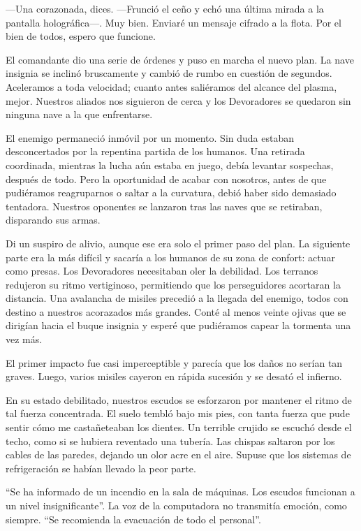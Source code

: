 —Una corazonada, dices. —Frunció el ceño y echó una última mirada a la pantalla holográfica—. Muy bien. Enviaré un mensaje cifrado a la flota. Por el bien de todos, espero que funcione.

El comandante dio una serie de órdenes y puso en marcha el nuevo plan. La nave insignia se inclinó bruscamente y cambió de rumbo en cuestión de segundos. Aceleramos a toda velocidad; cuanto antes saliéramos del alcance del plasma, mejor. Nuestros aliados nos siguieron de cerca y los Devoradores se quedaron sin ninguna nave a la que enfrentarse.

El enemigo permaneció inmóvil por un momento. Sin duda estaban desconcertados por la repentina partida de los humanos. Una retirada coordinada, mientras la lucha aún estaba en juego, debía levantar sospechas, después de todo. Pero la oportunidad de acabar con nosotros, antes de que pudiéramos reagruparnos o saltar a la curvatura, debió haber sido demasiado tentadora. Nuestros oponentes se lanzaron tras las naves que se retiraban, disparando sus armas.

Di un suspiro de alivio, aunque ese era solo el primer paso del plan. La siguiente parte era la más difícil y sacaría a los humanos de su zona de confort: actuar como presas. Los Devoradores necesitaban oler la debilidad. Los terranos redujeron su ritmo vertiginoso, permitiendo que los perseguidores acortaran la distancia. Una avalancha de misiles precedió a la llegada del enemigo, todos con destino a nuestros acorazados más grandes. Conté al menos veinte ojivas que se dirigían hacia el buque insignia y esperé que pudiéramos capear la tormenta una vez más.

El primer impacto fue casi imperceptible y parecía que los daños no serían tan graves. Luego, varios misiles cayeron en rápida sucesión y se desató el infierno.

En su estado debilitado, nuestros escudos se esforzaron por mantener el ritmo de tal fuerza concentrada. El suelo tembló bajo mis pies, con tanta fuerza que pude sentir cómo me castañeteaban los dientes. Un terrible crujido se escuchó desde el techo, como si se hubiera reventado una tubería. Las chispas saltaron por los cables de las paredes, dejando un olor acre en el aire. Supuse que los sistemas de refrigeración se habían llevado la peor parte.

``Se ha informado de un incendio en la sala de máquinas. Los escudos funcionan a un nivel insignificante''. La voz de la computadora no transmitía emoción, como siempre. ``Se recomienda la evacuación de todo el personal''.

